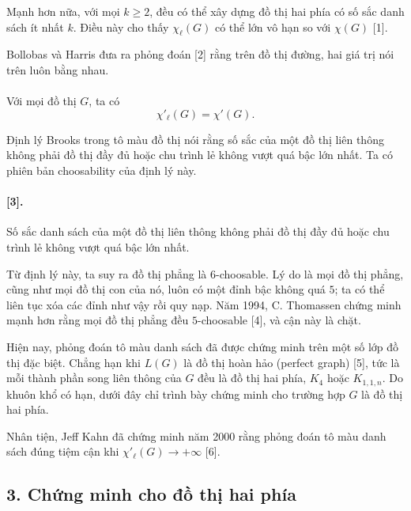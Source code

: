 \documentclass[11pt]{article}
\begin{document}

Mạnh hơn nữa, với mọi \(k\ge2\), đều có thể xây dựng đồ thị hai phía có số sắc
danh sách ít nhất \(k\). Điều này cho thấy \(\chi_{\ell}(G)\) có thể lớn vô hạn
so với \(\chi(G)\) [1].

Bollobas và Harris đưa ra phỏng đoán [2] rằng trên đồ thị đường, hai giá trị
nói trên luôn bằng nhau.

\paragraph{}
Với mọi đồ thị \(G\), ta có
\[
  \chi'_{\ell}(G)=\chi'(G).
\]

Định lý Brooks trong tô màu đồ thị nói rằng số sắc của một đồ thị liên thông
không phải đồ thị đầy đủ hoặc chu trình lẻ không vượt quá bậc lớn nhất. Ta có
phiên bản choosability của định lý này.

\paragraph{ [3].}
Số sắc danh sách của một đồ thị liên thông không phải đồ thị đầy đủ hoặc chu
trình lẻ không vượt quá bậc lớn nhất.

Từ định lý này, ta suy ra đồ thị phẳng là \(6\)-choosable. Lý do là mọi đồ thị
phẳng, cũng như mọi đồ thị con của nó, luôn có một đỉnh bậc không quá \(5\);
ta có thể liên tục xóa các đỉnh như vậy rồi quy nạp. Năm 1994, C. Thomassen
chứng minh mạnh hơn rằng mọi đồ thị phẳng đều \(5\)-choosable [4], và cận này
là chặt.

Hiện nay, phỏng đoán tô màu danh sách đã được chứng minh trên một số lớp đồ thị
đặc biệt. Chẳng hạn khi \(L(G)\) là đồ thị hoàn hảo (perfect graph) [5], tức là
mỗi thành phần song liên thông của \(G\) đều là đồ thị hai phía, \(K_4\) hoặc
\(K_{1,1,n}\). Do khuôn khổ có hạn, dưới đây chỉ trình bày chứng minh cho
trường hợp \(G\) là đồ thị hai phía.

Nhân tiện, Jeff Kahn đã chứng minh năm 2000 rằng phỏng đoán tô màu danh sách
đúng tiệm cận khi \(\chi'_{\ell}(G)\to+\infty\) [6].

\subsection*{3. Chứng minh cho đồ thị hai phía}
\end{document}

